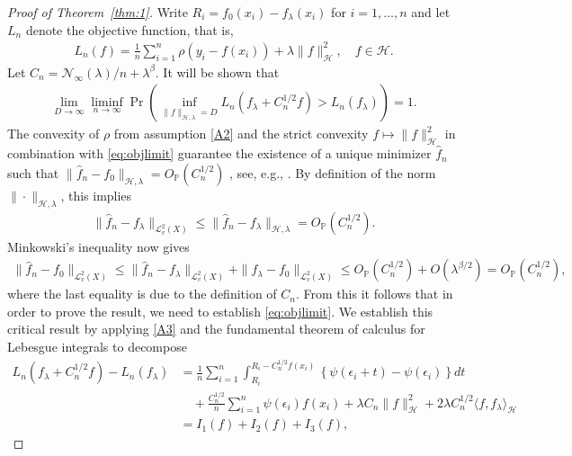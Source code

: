 \documentclass[11pt]{article}
\theoremstyle{definition}
\theoremstyle{remark}
\begin{document}
\begin{proof}[Proof of Theorem~\ref{thm:1}] 
Write $R_i =  f_0(x_i) - f_{\lambda}(x_i)$ for $i=1, \ldots, n$ and let $L_n$ denote the objective function, that is,
\begin{align*}
L_n(f)  = \frac{1}{n} \sum_{i=1}^n \rho\left(y_{i}-f(x_i) \right) + \lambda \|f\|_{\mathcal{H}}^2, \quad f \in \mathcal{H}.
\end{align*}
Let $C_n = \mathcal{N}_{\infty}(\lambda)/n+ \lambda^{\beta}$. It will be shown that
\begin{align}
\label{eq:objlimit}
\lim_{D \to \infty} \liminf_{n \to \infty} \Pr\left(\inf_{\|f\|_{\mathcal{H},\lambda}=D} L_n(f_{\lambda}+C_n^{1/2}f)> L_n(f_\lambda) \right) = 1.
\end{align}
The convexity of $\rho$ from assumption \ref{A2} and the strict convexity $f \mapsto \|f\|_{\mathcal{H}}^2$ in combination with \eqref{eq:objlimit} guarantee the existence of a unique minimizer $\widehat{f}_n$ such that $\|\widehat{f}_n-f_0\|_{\mathcal{H},\lambda} = O_{\mathbb{P}}(C_n^{1/2})$ , see, e.g., \citep[Lemma 1]{Kal:2022}. By definition of the norm $\|\cdot\|_{\mathcal{H},\lambda}$, this implies
\begin{align*}
\|\widehat{f}_n-f_\lambda\|_{\mathcal{L}^2_v(X)} \leq \|\widehat{f}_n-f_\lambda\|_{\mathcal{H},\lambda} = O_{\mathbb{P}}(C_n^{1/2}).
\end{align*}
Minkowski's inequality now gives
\begin{align*}
\|\widehat{f}_n-f_0\|_{\mathcal{L}^2_v(X)}\leq \|\widehat{f}_n-f_\lambda\|_{\mathcal{L}^2_v(X)} + \|f_\lambda- f_0 \|_{\mathcal{L}^2_v(X)} \leq  O_{\mathbb{P}}(C_n^{1/2}) + O(\lambda^{\beta/2}) = O_{\mathbb{P}}(C_n^{1/2}),
\end{align*}
where the last equality is due to the definition of $C_n$. From this it follows that in order to prove the result, we need to establish \eqref{eq:objlimit}. We establish this critical result by applying \ref{A3} and the fundamental theorem of calculus for Lebesgue integrals to decompose
\begin{align*}
L_n(f_{\lambda}	+C_n^{1/2}f) - L_n(f_{\lambda}) & = \frac{1}{n} \sum_{i=1}^n \int_{R_i}^{R_i-C_n^{1/2}f(x_i)} \left\{ \psi\left(\epsilon_i+t \right) - \psi \left( \epsilon_i \right) \right\} d t 
\\ & \quad + \frac{C_n^{1/2}}{n} \sum_{i=1}^n \psi\left(\epsilon_i \right) f(x_i) + \lambda C_n \|f\|_{\mathcal{H}}^2 +  2 \lambda C_n^{1/2} \langle f, f_\lambda \rangle_{\mathcal{H}}
\\ & = I_1(f) + I_2(f) + I_3(f),

\end{align*}
\end{proof}
\end{document}
